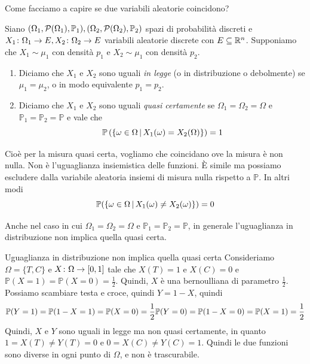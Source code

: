\documentclass[a4paper]{article}
\begin{document}
Come facciamo a capire se due variabili aleatorie coincidono?

\begin{snippetdefinition}{}
    Siano \((\Omega_1, \mathcal P(\Omega_1), \mathbb P_1), (\Omega_2, \mathcal P(\Omega_2), \mathbb P_2)\)
    spazi di probabilità discreti
    e \(X_1 \colon \Omega_1 \to E, X_2 \colon \Omega_2 \to E\)
    variabili aleatorie discrete con \(E \subseteq \mathbb{R}^n\).
    Supponiamo che \(X_1 \sim \mu_1\) con densità \(p_1\)
    e \(X_2 \sim \mu_1\) con densità \(p_2\).
    \begin{enumerate}
        \item Diciamo che \(X_1\) e \(X_2\) sono uguali \emph{in legge}
            (o in distribuzione o debolmente)
            se \(\mu_1 = \mu_2\), o in modo equivalente \(p_1 = p_2\).
        \item Diciamo che \(X_1\) e \(X_2\) sono uguali \emph{quasi certamente}
            se \(\Omega_1 = \Omega_2 = \Omega\) e \(\mathbb P_1 = \mathbb P_2 = \mathbb P\)
            e vale che
            \[
                \mathbb P\left(
                    \{
                        \omega \in \Omega \,|\, X_1(\omega) = X_2(\Omega)
                    \}
                \right) = 1
            \]
    \end{enumerate}
\end{snippetdefinition}

Cioè per la misura quasi certa, vogliamo che coincidano ove la misura è non nulla.
Non è l'uguaglianza insiemistica delle funzioni.
È simile ma possiamo escludere dalla variabile aleatoria insiemi di misura nulla
rispetto a \(\mathbb P\).
In altri modi
\[
    \mathbb P(\{
            \omega\in \Omega \,|\, X_1(\omega) \neq X_2(\omega)
    \}) = 0
\]

Anche nel caso in cui \(\Omega_1 = \Omega_2 = \Omega\) e \(\mathbb P_1 = \mathbb P_2 = \mathbb P\),
in generale l'uguaglianza in distribuzione non implica quella quasi certa.

\begin{snippetexample}{Uguaglianza in distribuzione non implica quella quasi certa}
    Consideriamo \(\Omega = \{T,C\}\)
    e \(X \colon \Omega \to [0,1]\) tale che \(X(T) = 1\)
    e \(X(C) = 0\) e \(\mathbb P(X = 1) = \mathbb P(X=0) = \frac12\).
    Quindi, \(X\) è una bernoulliana di parametro \(\frac12\).
    Possiamo scambiare testa e croce, quindi \(Y = 1-X\),
    quindi \[
        \mathbb P(Y = 1) = \mathbb P(1-X = 1) = \mathbb P(X=0) = \frac12\\
        \mathbb P(Y = 0) = \mathbb P(1-X = 0) = \mathbb P(X=1) = \frac12
    \]
    Quindi, \(X\) e \(Y\) sono uguali in legge ma
    non quasi certamente, in quanto \(1 = X(T) \neq Y(T) = 0\)
    e \(0 = X(C) \neq Y(C) = 1\).
    Quindi le due funzioni sono diverse in ogni punto di \(\Omega\),
    e non è trascurabile.
\end{snippetexample}
\end{document}
